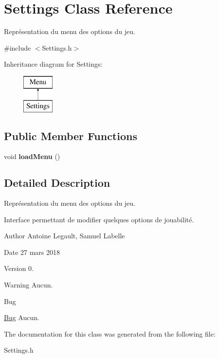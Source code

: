 \hypertarget{class_settings}{}\section{Settings Class Reference}
\label{class_settings}


Représentation du menu des options du jeu.  




{\ttfamily \#include $<$Settings.\+h$>$}

Inheritance diagram for Settings\+:\begin{figure}[H]
\begin{center}
\leavevmode
\includegraphics[height=2.000000cm]{class_settings}
\end{center}
\end{figure}
\subsection*{Public Member Functions}
\begin{DoxyCompactItemize}
\item 
\hypertarget{class_settings_a5550f5ebc65c3bcd1de08888d3084727}{}void {\bfseries load\+Menu} ()\label{class_settings_a5550f5ebc65c3bcd1de08888d3084727}

\end{DoxyCompactItemize}


\subsection{Detailed Description}
Représentation du menu des options du jeu. 

Interface permettant de modifier quelques options de jouabilité. \begin{DoxyAuthor}{Author}
Antoine Legault, Samuel Labelle 
\end{DoxyAuthor}
\begin{DoxyDate}{Date}
27 mars 2018 
\end{DoxyDate}
\begin{DoxyVersion}{Version}
0. 
\end{DoxyVersion}
\begin{DoxyWarning}{Warning}
Aucun. 
\end{DoxyWarning}
\begin{DoxyRefDesc}{Bug}
\item[\hyperlink{bug__bug000018}{Bug}]Aucun. \end{DoxyRefDesc}


The documentation for this class was generated from the following file\+:\begin{DoxyCompactItemize}
\item 
Settings.\+h\end{DoxyCompactItemize}
